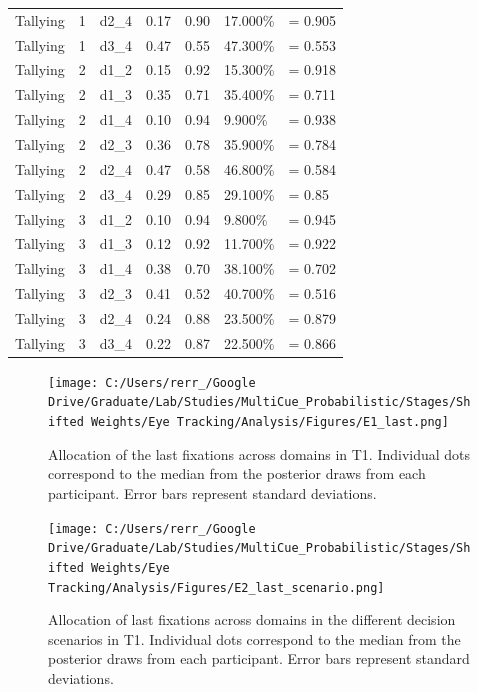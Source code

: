 \documentclass[
  english,
  man]{apa6}
\begin{document}
\begin{center}
\begin{ThreePartTable}
\begin{longtable}{lllllll}
Tallying & 1 & d2\_4 & 0.17 & 0.90 & 17.000\% & = 0.905\\
Tallying & 1 & d3\_4 & 0.47 & 0.55 & 47.300\% & = 0.553\\
Tallying & 2 & d1\_2 & 0.15 & 0.92 & 15.300\% & = 0.918\\
Tallying & 2 & d1\_3 & 0.35 & 0.71 & 35.400\% & = 0.711\\
Tallying & 2 & d1\_4 & 0.10 & 0.94 & 9.900\% & = 0.938\\
Tallying & 2 & d2\_3 & 0.36 & 0.78 & 35.900\% & = 0.784\\
Tallying & 2 & d2\_4 & 0.47 & 0.58 & 46.800\% & = 0.584\\
Tallying & 2 & d3\_4 & 0.29 & 0.85 & 29.100\% & = 0.85\\
Tallying & 3 & d1\_2 & 0.10 & 0.94 & 9.800\% & = 0.945\\
Tallying & 3 & d1\_3 & 0.12 & 0.92 & 11.700\% & = 0.922\\
Tallying & 3 & d1\_4 & 0.38 & 0.70 & 38.100\% & = 0.702\\
Tallying & 3 & d2\_3 & 0.41 & 0.52 & 40.700\% & = 0.516\\
Tallying & 3 & d2\_4 & 0.24 & 0.88 & 23.500\% & = 0.879\\
Tallying & 3 & d3\_4 & 0.22 & 0.87 & 22.500\% & = 0.866\\
\bottomrule
\end{longtable}

\end{ThreePartTable}
\end{center}

\begin{figure}
\centering
\texttt{[image: C:/Users/rerr\_/Google Drive/Graduate/Lab/Studies/MultiCue\_Probabilistic/Stages/Shifted Weights/Eye Tracking/Analysis/Figures/E1\_last.png]}
\caption{\label{fig:last}Allocation of the last fixations across domains in T1. Individual dots correspond to the median from the posterior draws from each participant. Error bars represent standard deviations.}
\end{figure}

\begin{figure}
\centering
\texttt{[image: C:/Users/rerr\_/Google Drive/Graduate/Lab/Studies/MultiCue\_Probabilistic/Stages/Shifted Weights/Eye Tracking/Analysis/Figures/E2\_last\_scenario.png]}
\caption{\label{fig:last-scenario}Allocation of last fixations across domains in the different decision scenarios in T1. Individual dots correspond to the median from the posterior draws from each participant. Error bars represent standard deviations.}
\end{figure}
\end{document}
